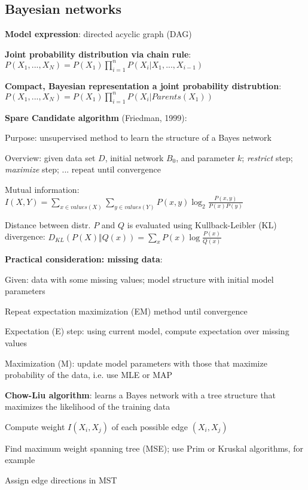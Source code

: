 \documentclass[letterpaper,fontsize=5pt]{scrartcl}
\renewenvironment{enumerate}[1]{\begin{compactenum}#1}{\end{compactenum}}
\theoremstyle{definition}
\begin{document}
\begin{multicols}{2}
\section{Bayesian networks}
\begin{enumerate}
	\item \textbf{Model expression}: directed acyclic graph (DAG)
	\item \textbf{Joint probability distribution via chain rule}: $P(X_1,...,X_N) = P(X_1) \prod\limits_{i=1}^n P(X_i|X_1,...,X_{i-1})$
	\item \textbf{Compact, Bayesian representation a joint probability distrubtion}: $P(X_1,...,X_N) = P(X_1) \prod\limits_{i=1}^n P(X_i|Parents(X_1))$
	\item \textbf{Spare Candidate algorithm} (Friedman, 1999): 
		\begin{enumerate}
			\item Purpose: unsupervised method to learn the structure of a Bayes network
			\item Overview: given data set $D$, initial network $B_0$, and parameter $k$; \emph{restrict} step; \emph{maximize} step; ... repeat until convergence
			\item Mutual information: $I(X,Y) = \sum\limits_{x \in values(X)} \sum\limits_{y \in values(Y)} P(x,y) \log_{2} \frac{P(x,y)}{P(x)P(y)}$
			\item Distance between distr. $P$ and $Q$ is evaluated using Kullback-Leibler (KL) divergence: $D_{KL}(P(X)\Vert Q(x)) = \sum\limits_x P(x) \log \frac{P(x)}{Q(x)}$
		\end{enumerate}
	\item \textbf{Practical consideration: missing data}:
		\begin{enumerate}
			\item Given: data with some missing values; model structure with initial model parameters
			\item Repeat expectation maximization (EM) method until convergence
				\begin{enumerate}
					\item Expectation (E) step: using current model, compute expectation over missing values
					\item Maximization (M): update model parameters with those that maximize probability of the data, i.e. use MLE or MAP
				\end{enumerate}
		\end{enumerate}
	\item \textbf{Chow-Liu algorithm}: learns a Bayes network with a tree structure that maximizes the likelihood of the training data
		\begin{enumerate}
			\item Compute weight $I(X_i,X_j)$ of each possible edge $(X_i,X_j)$
			\item Find maximum weight spanning tree (MSE); use Prim or Kruskal algorithms, for example
			\item Assign edge directions in MST
		\end{enumerate}
\end{enumerate}

\end{multicols}
\end{document}
